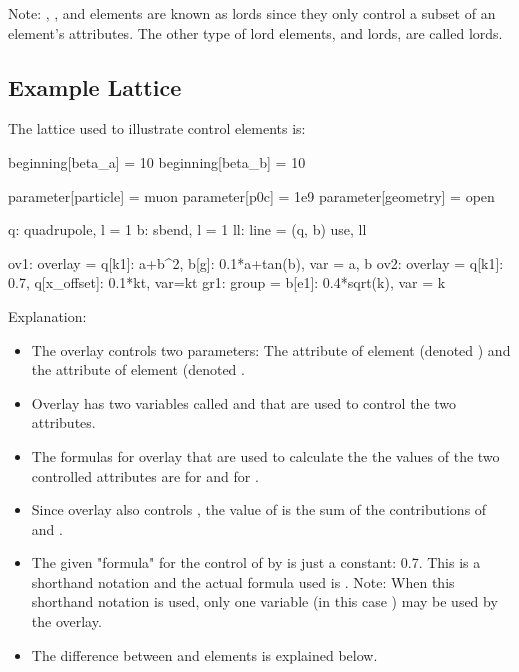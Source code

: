 \documentclass{hitec}
\begin{document}
Note: , , and  elements are known as  lords since they
only control a subset of an element's attributes. The other type of lord elements, 
and  lords, are called  lords.

\subsection{Example Lattice}


The lattice used to illustrate control elements is:
{\small
\begin{code}
beginning[beta_a] = 10
beginning[beta_b] = 10

parameter[particle] = muon
parameter[p0c] = 1e9
parameter[geometry] = open

q: quadrupole, l = 1
b: sbend, l = 1
ll: line = (q, b)
use, ll

ov1: overlay = {q[k1]: a+b^2, b[g]: 0.1*a+tan(b)}, var = {a, b}
ov2: overlay = {q[k1]: 0.7, q[x_offset]: 0.1*kt}, var={kt}
gr1: group = {b[e1]: 0.4*sqrt(k)}, var = {k}
\end{code}}

Explanation:
\begin{itemize}
\item
The overlay  controls two parameters: 
The  attribute of element  (denoted ) and the  attribute of element
 (denoted .
\item
Overlay  has two variables called  and  that are used to control the two attributes.
\item
The formulas for overlay  that are used to calculate the the values of the two controlled
attributes are  for  and  for .
\item 
Since overlay  also controls , the value of  is the sum of the
contributions of  and .
\item
The given "formula" for the control of  by  is just a constant: 0.7. 
This is a shorthand notation and the actual formula used is . 
Note: When this shorthand notation is used, only one variable (in this case ) may be used by the overlay.
\item
The difference between  and  elements is explained below.
\end{itemize}
\end{document}

